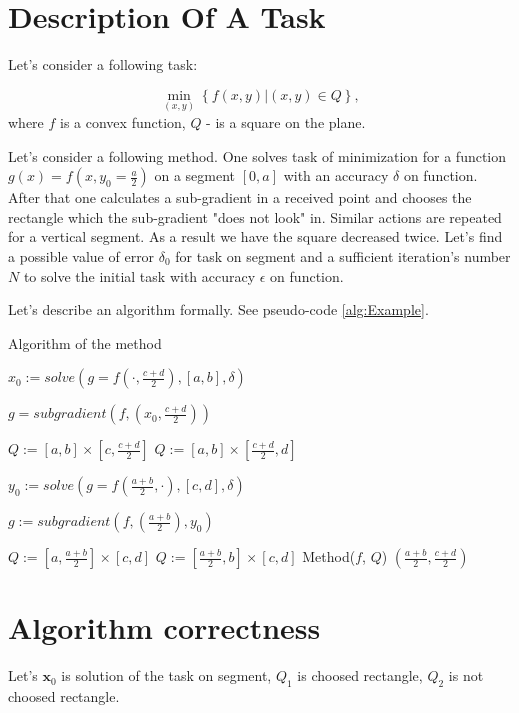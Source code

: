 \documentclass[12pt]{article}
\begin{document}
\tableofcontents
\newpage

\section{Description Of A Task}

Let's consider a following task:

$$\min_{(x,y)}\left\{f(x,y)|(x,y) \in Q\right\},$$
where $f$ is a convex function, $Q$ - is a square on the plane.

Let's consider a following method. One solves task of minimization for a function $g(x) = f\left(x, y_0 = \frac{a}{2}\right)$ on a segment $[0, a]$ with an accuracy $\delta$ on function. After that one calculates a sub-gradient in a received point and chooses the rectangle which the sub-gradient "does not look" in. Similar actions are repeated for a vertical segment. As a result we have the square decreased twice. Let's find a possible value of error $\delta_0$ for task on segment and a sufficient iteration's number $N$ to solve the initial task with accuracy $\epsilon$ on function.

Let's describe an algorithm formally. See pseudo-code \ref{alg:Example}.

\begin{algorithm}[H]
\caption{Algorithm of the method}\label{alg:Example}
\begin{algorithmic}[1]

$x_0:= solve(g = f(\cdot, \frac{c+d}{2}), [a,b], \delta)$
 
$g = subgradient(f, (x_0, \frac{c+d}{2}))$
 
\State$Q := [a,b] \times [c, \frac{c+d}{2}]$ 
\Else
\State$Q := [a,b] \times [\frac{c+d}{2}, d]$ 
\EndIf

 $y_0:= solve(g = f(\frac{a+b}{2}, \cdot), [c,d], \delta)$
 
 $g := subgradient(f, (\frac{a+b}{2}), y_0)$
 
 \State$Q := [a, \frac{a+b}{2}] \times [c, d]$ 
\Else
\State$Q := [\frac{a+b}{2},b] \times [c, d]$ 
\EndIf
{}
\State Method($f$, $Q$) 
\EndIf
\Return $(\frac{a+b}{2}, \frac{c+d}{2})$
\EndFunction 
 \end{algorithmic}
\end{algorithm}

\section{Algorithm correctness}
Let's $\textbf{x}_0$ is solution of the task on segment, $Q_1$ is choosed rectangle, $Q_2$ is not choosed rectangle.
\end{document}
